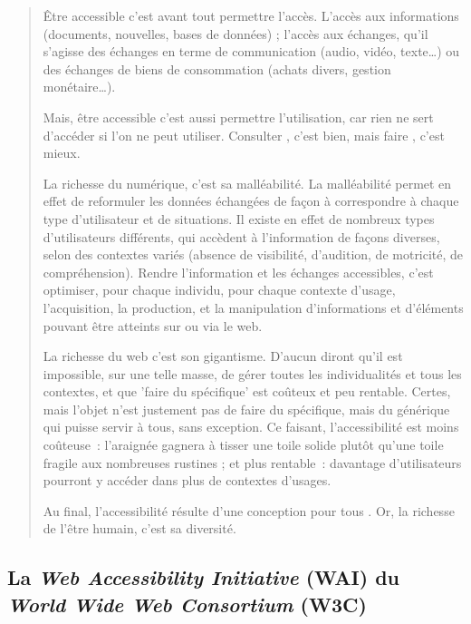 \documentclass[
]{book}
\begin{document}
\begin{quote}
Être accessible c'est avant tout permettre l'accès. L'accès aux
informations (documents, nouvelles, bases de données) ; l'accès aux
échanges, qu'il s'agisse des échanges en terme de communication (audio,
vidéo, texte\ldots) ou des échanges de biens de consommation (achats divers,
gestion monétaire\ldots).

Mais, être accessible c'est aussi permettre l'utilisation, car rien ne
sert d'accéder si l'on ne peut utiliser. Consulter , c'est bien, mais faire
, c'est mieux.

La richesse du numérique, c'est sa malléabilité. La malléabilité permet
en effet de reformuler les données échangées de façon à correspondre à
chaque type d'utilisateur et de situations. Il existe en effet de nombreux
types d'utilisateurs différents, qui accèdent à l'information de façons
diverses, selon des contextes variés (absence de visibilité, d'audition, de
motricité, de compréhension). Rendre l'information et les échanges
accessibles, c'est optimiser, pour chaque individu, pour chaque contexte
d'usage, l'acquisition, la production, et la manipulation d'informations et
d'éléments pouvant être atteints sur ou via le web.

La richesse du web c'est son gigantisme. D'aucun diront qu'il est
impossible, sur une telle masse, de gérer toutes les individualités et tous
les contextes, et que 'faire du spécifique' est coûteux et peu rentable.
Certes, mais l'objet n'est justement pas de faire du spécifique, mais du
générique qui puisse servir à tous, sans exception. Ce faisant,
l'accessibilité est moins coûteuse~: l'araignée gagnera à tisser une toile
solide plutôt qu'une toile fragile aux nombreuses rustines ; et plus
rentable~: davantage d'utilisateurs pourront y accéder dans plus de
contextes d'usages.

Au final, l'accessibilité résulte d'une conception pour tous . Or, la
richesse de l'être humain, c'est sa diversité.
\end{quote}

\hypertarget{la-web-accessibility-initiative-wai-du-world-wide-web-consortium-w3c}{%
\subsection{\texorpdfstring{La \emph{Web Accessibility Initiative} (WAI) du \emph{World Wide Web Consortium} (W3C)}{La Web Accessibility Initiative (WAI) du World Wide Web Consortium (W3C)}}\label{la-web-accessibility-initiative-wai-du-world-wide-web-consortium-w3c}}
\end{document}

